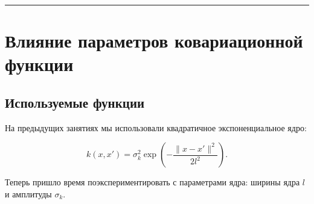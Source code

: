 \documentclass[11pt,a4paper]{article}
\begin{document}
    \begin{center}
    \end{center}

    \begin{center}
    \end{center}

    \begin{center}
    \end{center}

    \begin{center}\rule{0.5\linewidth}{0.5pt}\end{center}

    \hypertarget{ux432ux43bux438ux44fux43dux438ux435-ux43fux430ux440ux430ux43cux435ux442ux440ux43eux432-ux43aux43eux432ux430ux440ux438ux430ux446ux438ux43eux43dux43dux43eux439-ux444ux443ux43dux43aux446ux438ux438}{%
\section{Влияние параметров ковариационной
функции}\label{ux432ux43bux438ux44fux43dux438ux435-ux43fux430ux440ux430ux43cux435ux442ux440ux43eux432-ux43aux43eux432ux430ux440ux438ux430ux446ux438ux43eux43dux43dux43eux439-ux444ux443ux43dux43aux446ux438ux438}}

    \hypertarget{ux438ux441ux43fux43eux43bux44cux437ux443ux435ux43cux44bux435-ux444ux443ux43dux43aux446ux438ux438}{%
\subsection{Используемые
функции}\label{ux438ux441ux43fux43eux43bux44cux437ux443ux435ux43cux44bux435-ux444ux443ux43dux43aux446ux438ux438}}

На предыдущих занятиях мы использовали квадратичное экспоненциальное
ядро:

\[
  k(x, x') = \sigma_k^2 \exp{ \left( -\frac{\lVert x - x' \rVert^2}{2l^2} \right) }.
\]

Теперь пришло время поэкспериментировать с параметрами ядра: ширины ядра
\(l\) и амплитуды \(\sigma_k\).
\end{document}
